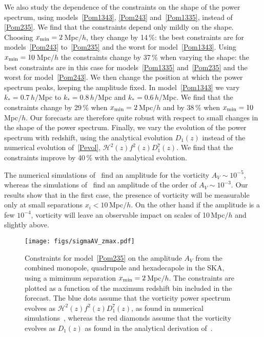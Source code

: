 \documentclass[a4paper,twocolumn,aps,prd,nolongbibliography,superscriptaddress,showpacs,showkeys,amsmath,amssymb,floatfix,nofootinbib]{revtex4-1}
\renewcommand{\[}{\begin{equation}}
\renewcommand{\]}{\end{equation}}
\newcommand{\Hcal}{\mathcal{H}}
\begin{document}
We also study the dependence of the constraints on the shape of the power spectrum, using models~\eqref{Pom1343}, \eqref{Pom243} and~\eqref{Pom1335}, instead of \eqref{Pom235}. We find that the constraints depend only mildly on the shape. Choosing $x_{\rm min}=2$\,Mpc$/h$, they change by 14\,$\%$: the best constraints are for models~\eqref{Pom243} to~\eqref{Pom235} and the worst for model~\eqref{Pom1343}. Using $x_{\rm min}=10$\,Mpc$/h$ the constraints change by 37\,$\%$ when varying the shape: the best constraints are in this case for models~\eqref{Pom1335} and~\eqref{Pom235} and the worst for model~\eqref{Pom243}. We then change the position at which the power spectrum peaks, keeping the amplitude fixed. In model~\eqref{Pom1343} we vary $k_*=0.7\,h/$Mpc to $k_*=0.8\,h/$Mpc and  $k_*=0.6\,h/$Mpc. We find that the constraints change by 29\,\% when  $x_{\rm min}=2$\,Mpc$/h$ and by 38\,\% when $x_{\rm min}=10$\,Mpc$/h$. Our forecasts are therefore quite robust with respect to small changes in the shape of the power spectrum. Finally, we vary the evolution of the power spectrum with redshift, using the analytical evolution $D_1(z)$ instead of the numerical evolution of~\eqref{Pevol}, $\Hcal^2(z)f^2(z)D_1^7(z)$. We find that the constraints improve by 40\,\% with the analytical evolution.

The numerical simulations of~\cite{Pueblas:2008uv} find an amplitude for the vorticity $A_V\sim 10^{-5}$, whereas the simulations of~\cite{Zhu:2017vtj} find an amplitude of the order of $A_V\sim 10^{-3}$.  Our results show that in the first case, the presence of vorticity will be measurable only at small separations $x_i < 10$\,Mpc$/h$. On the other hand if the amplitude is a few $10^{-4}$, vorticity will leave an observable impact on scales of 10\,Mpc$/h$ and slightly above. 

\begin{figure*}[th]
\texttt{[image: figs/sigmaAV\_zmax.pdf]}
\caption{\label{f:zmax} Constraints for model~\eqref{Pom235} on the amplitude $A_V$ from the combined monopole, quadrupole and hexadecapole in the SKA, using a mimimum separation $x_{\rm min}=2$\,Mpc$/h$. The constraints are plotted as a function of the maximum redshift bin included in the forecast. The blue dots assume that the vorticity power spectrum evolves as $\Hcal^2(z)f^2(z)D_1^7(z)$, as found in numerical simulations~\cite{Pueblas:2008uv}, whereas the red diamonds assume that the vorticity evolves as $D_1(z)$ as found in the analytical derivation of~\cite{Cusin:2016zvu}.}
\end{figure*}
\end{document}
